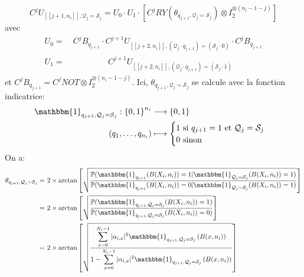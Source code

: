 \[
C^jU_{[\![j+1,n_i]\!], \mathcal{Q}_j=\mathcal{S}_j} = U_0 \cdot U_1 \cdot [C^jRY(\theta_{q_{j+1}, \mathcal{Q}_j=\mathcal{S}_j})\otimes I_2^{\otimes (n_i-1-j)}]
\]
avec
\begin{align*}
U_0 =&\ C^jB_{q_{j+1}} \cdot C^{j+1}U_{[\![j+2,n_i]\!], (\mathcal{Q}_j\cdot q_{j+1})=(\mathcal{S}_j \cdot 0)} \cdot  C^jB_{q_{j+1}}  \\
U_1 =&\ \ \qquad \qquad C^{j+1}U_{[\![j+2,n_i]\!], (\mathcal{Q}_j\cdot q_{j+1})=(\mathcal{S}_j \cdot 1)}
\end{align*}
et 
$C^jB_{q_{j+1}} = C^jNOT \otimes I_2^{\otimes (n_i-1-j)}$. 
Ici, $\theta_{q_{j+1}, \mathcal{Q}_j=\mathcal{S}_j}$ se calcule avec la fonction indicatrice:
\begin{align*}
    \mathbbm{1}_{q_{j+1}, \mathcal{Q}_j=\mathcal{S}_j} : {\{0,1\}}^{n_i} &\longrightarrow \{0,1\} \\
    (q_1, \hdots ,q_{n_i}) &\longmapsto
 \begin{cases}
 1 \ \mathrm{si} \ q_{j+1} = 1 \ \mathrm{et} \ \mathcal{Q}_j=\mathcal{S}_j\\
 0 \ \mathrm{sinon}
 \end{cases}
\end{align*}
On a:
\begin{align*}
    \theta_{q_{j+1}, \mathcal{Q}_j=\mathcal{S}_j} =&\ 2\times\mathrm{arctan}\left[\sqrt{\frac{\displaystyle \mathbb{P}(\mathbbm{1}_{q_{j+1}}(B(X_i,n_i))=1|\mathbbm{1}_{\mathcal{Q}_j=\mathcal{S}_j}(B(X_i,n_i))=1)}{\displaystyle \mathbb{P}(\mathbbm{1}_{q_{j+1}}(B(X_i,n_i))=0|\mathbbm{1}_{\mathcal{Q}_j=\mathcal{S}_j}(B(X_i,n_i))=1)}}\right] \\
    =&\ 2\times\mathrm{arctan}\left[\sqrt{\frac{\displaystyle \mathbb{P}(\mathbbm{1}_{q_{j+1}, \mathcal{Q}_j=\mathcal{S}_j}(B(X_i,n_i))=1)}{\displaystyle \mathbb{P}(\mathbbm{1}_{q_{j+1}, \mathcal{Q}_j=\mathcal{S}_j}(B(X_i,n_i))=0)}}\right] \\
    =&\ 2\times\mathrm{arctan}\left[\sqrt{\frac{\displaystyle \sum_{x=0}^{N_i-1}|\alpha_{i,x}|^2\mathbbm{1}_{q_{j+1}, \mathcal{Q}_j=\mathcal{S}_j}\left(B(x,n_i)\right)}{\displaystyle 1-\sum_{x=0}^{N_i-1}|\alpha_{i,x}|^2\mathbbm{1}_{q_{j+1}, \mathcal{Q}_j=\mathcal{S}_j}\left(B(x,n_i)\right)}}\right]
\end{align*}
